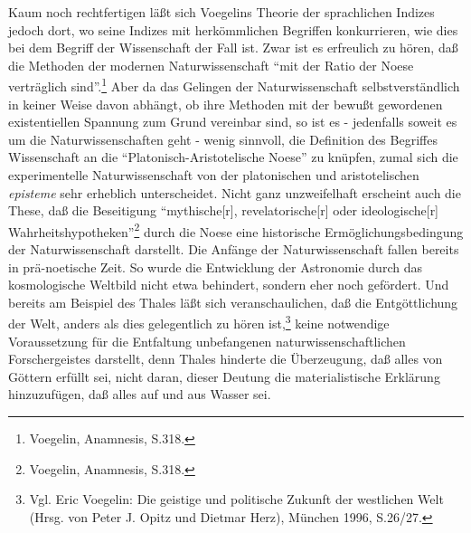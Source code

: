 Kaum noch rechtfertigen läßt sich Voegelins Theorie der sprachlichen Indizes
jedoch dort, wo seine Indizes mit herkömmlichen Begriffen konkurrieren, wie
dies bei dem Begriff der Wissenschaft der Fall ist. Zwar ist es erfreulich zu
hören, daß die Methoden der modernen Naturwissenschaft "`mit der Ratio der
Noese verträglich sind"'.\footnote{Voegelin, Anamnesis, S.318.} Aber da das
Gelingen der Naturwissenschaft selbstverständlich in keiner Weise davon
abhängt, ob ihre Methoden mit der bewußt gewordenen existentiellen Spannung
zum Grund vereinbar sind, so ist es - jedenfalls soweit es um die
Naturwissenschaften geht - wenig sinnvoll, die Definition des Begriffes
Wissenschaft an die "`Platonisch-Aristotelische Noese"' zu knüpfen, zumal sich
die experimentelle Naturwissenschaft von der platonischen und aristotelischen
{\it episteme} sehr erheblich unterscheidet. Nicht ganz unzweifelhaft
erscheint auch die These, daß die Beseitigung "`mythische[r],
revelatorische[r] oder ideologische[r]
Wahrheitshypotheken"'\footnote{Voegelin, Anamnesis, S.318.}  durch die Noese
eine historische Ermöglichungsbedingung der Naturwissenschaft darstellt. Die
Anfänge der Naturwissenschaft fallen bereits in prä-noetische Zeit. So wurde
die Entwicklung der Astronomie durch das kosmologische Weltbild nicht etwa
behindert, sondern eher noch gefördert. Und bereits am Beispiel des Thales
läßt sich veranschaulichen, daß die Entgöttlichung der Welt, anders als dies
gelegentlich zu hören ist,\footnote{Vgl. Eric Voegelin: Die geistige und
  politische Zukunft der westlichen Welt (Hrsg. von Peter J.  Opitz und
  Dietmar Herz), München 1996, S.26/27.} keine notwendige Voraussetzung für
die Entfaltung unbefangenen naturwissenschaftlichen Forschergeistes darstellt,
denn Thales hinderte die Überzeugung, daß alles von Göttern erfüllt sei, nicht
daran, dieser Deutung die materialistische Erklärung hinzuzufügen, daß alles
auf und aus Wasser sei.


